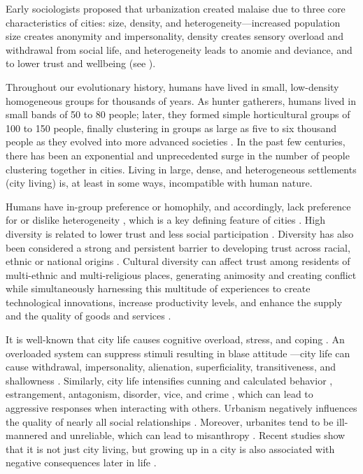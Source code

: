 \documentclass[11pt, letterpaper]{article}
\begin{document}
\begin{spacing}{1.4}
Early sociologists proposed that urbanization created malaise due to three core characteristics of cities: size, density, and heterogeneity---increased population size creates anonymity and
 impersonality, density creates sensory overload and withdrawal from social
 life, and heterogeneity leads to anomie and deviance, and to lower trust and wellbeing (see \citet{park84,
   simmel03, tonnies57, wirth38,putnam07,aok_brfss_segregation15,herbst14,postmes02,vogt07,smelser99}).
%

Throughout our evolutionary history, humans have lived in small, low-density
homogeneous groups for thousands of years. As hunter gatherers, humans lived in small bands of 50 to 80
people; later, they formed simple horticultural groups of 100 to 150 people,
finally clustering in groups as large as five to six thousand people as they
evolved into more advanced societies \citep{maryanski92}. In the past few centuries, 
there has been an exponential and unprecedented surge in the number of people clustering together in cities.
Living in large,
dense, and heterogeneous settlements (city living) is, at least in some ways, incompatible with human nature.

Humans have in-group preference or homophily, and
accordingly, lack preference for or dislike heterogeneity
\citep{smith14,mcpherson01,bleidorn16,putnam07}, which is a key defining feature
of cities \citep{wirth38,amin06,thrift05}. High diversity is related to lower trust and less social participation \citep{alesina99,alesina00,luttmer01,alesina02,rodriguez2019does}.  
Diversity has also been considered a strong and persistent barrier to developing trust across racial, ethnic or national origins \citep{glaeser00}. Cultural diversity can affect trust among residents of multi-ethnic and multi-religious places, generating animosity and creating conflict while simultaneously harnessing this multitude of experiences to create technological innovations, increase productivity levels, and enhance the supply and the quality of goods and services \citep{rodriguez2019does}. 

It is well-known that city life causes cognitive overload, stress, and coping \citep{simmel03, milgram70,lederbogen11}. An overloaded system can suppress stimuli resulting in blase attitude
\citep{simmel03}---city life can cause withdrawal, impersonality, alienation, superficiality, transitiveness, and shallowness \citep{wirth38}. Similarly, city life intensifies cunning and calculated behavior \citep{tonnies57}, estrangement, antagonism, disorder, vice, and crime
\citep{milgram70,park15,park84,bettencourt10b}, which can lead to aggressive
responses when interacting with others.
%
Urbanism negatively influences the quality of nearly all social relationships
\citep{wilson85}. Moreover, urbanites tend to be ill-mannered and unreliable,
which can lead to misanthropy
\citep[e.g.,][]{aokCityBook15,aok-sizeFetish17}. Recent studies show that it is not just city living, but growing up in a city is also associated with negative consequences later in life \citep{lederbogen11,aok20}.


\end{spacing}
\end{document}
